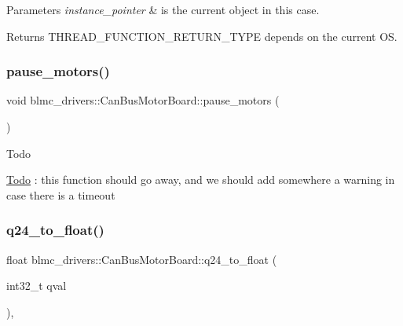 \begin{DoxyParams}{Parameters}
{\em instance\+\_\+pointer} & is the current object in this case. \\
\hline
\end{DoxyParams}
\begin{DoxyReturn}{Returns}
T\+H\+R\+E\+A\+D\+\_\+\+F\+U\+N\+C\+T\+I\+O\+N\+\_\+\+R\+E\+T\+U\+R\+N\+\_\+\+T\+Y\+PE depends on the current OS. 
\end{DoxyReturn}
\mbox{\label{classblmc__drivers_1_1CanBusMotorBoard_a19ffd7d9ef9a441299164485e85ec6fd}} 
\subsubsection{\texorpdfstring{pause\+\_\+motors()}{pause\_motors()}}
{\footnotesize\ttfamily void blmc\+\_\+drivers\+::\+Can\+Bus\+Motor\+Board\+::pause\+\_\+motors (\begin{DoxyParamCaption}{ }\end{DoxyParamCaption})}

\begin{DoxyRefDesc}{Todo}
\item[\hyperlink{todo__todo000003}{Todo}]\+: this function should go away, and we should add somewhere a warning in case there is a timeout \end{DoxyRefDesc}
\mbox{\label{classblmc__drivers_1_1CanBusMotorBoard_a05db7868ff7034289358cdb774b59720}} 
\subsubsection{\texorpdfstring{q24\+\_\+to\+\_\+float()}{q24\_to\_float()}}
{\footnotesize\ttfamily float blmc\+\_\+drivers\+::\+Can\+Bus\+Motor\+Board\+::q24\+\_\+to\+\_\+float (\begin{DoxyParamCaption}\item[{int32\+\_\+t}]{qval }\end{DoxyParamCaption})\hspace{0.3cm}{\ttfamily [inline]}, {\ttfamily [private]}}



